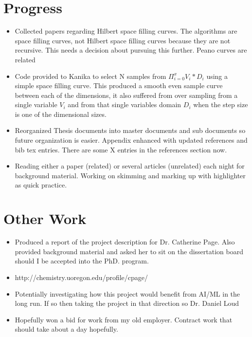 \documentclass[12pt]{article}
\begin{document}
\section{Progress}
\begin{itemize}
\item Collected papers regarding Hilbert space filling curves. The algorithms are space filling curves, not Hilbert space filling curves because they are not recursive. This needs a decision about pursuing this further. Peano curves are related
\item Code provided to Kanika to select N samples from $\Pi_{i=0}^{x} V_i*D_i$ using a simple space filling curve. This produced a smooth even sample curve between each of the dimensions, it also suffered from over sampling from a single variable $V_i$ and from that single variables domain $D_i$ when the step size is one of the dimensional sizes.

\item Reorganized Thesis documents into master documents and sub documents so future organization is easier. Appendix enhanced with updated references and bib tex entries. There are some X entries in the references section now. 
\item Reading either a paper (related) or several articles (unrelated) each night for background material. Working on skimming and marking up with highlighter as quick practice. 
\end{itemize}
\section{Other Work}
\begin{itemize}
\item Produced a report of the project description for Dr. Catherine Page.  Also provided background material and asked her to sit on the dissertation board should I be accepted into the PhD. program.  
\item http://chemistry.uoregon.edu/profile/cpage/
\item Potentially investigating how this project would benefit from AI/ML in the long run. If so then taking the project in that direction so Dr. Daniel Loud  
\item Hopefully won a bid for work from my old employer. Contract work that should take about a day hopefully.
\end{itemize}
\newpage
\end{document}
